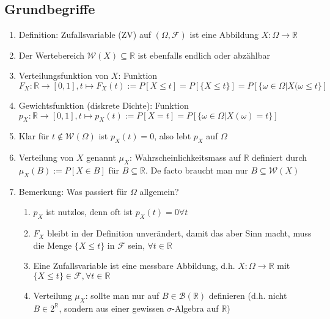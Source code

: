 \documentclass[10pt]{article}
\newcommand{\enumstart}{\begin{enumerate}}
\newcommand{\enumend}{\end{enumerate}}
\newcommand{\R}{\mathbb{R}}
\newcommand{\F}{\mathcal{F}}
\newcommand{\W}{\mathcal{W}}
\newcommand{\B}{\mathcal{B}}
\begin{document}
\subsection{Grundbegriffe}
\enumstart
	\item Definition: Zufallsvariable (ZV) auf $(\Omega, \F)$ ist eine Abbildung $X: \Omega \rightarrow \R$
	\item Der Wertebereich $\W(X) \subseteq \R$ ist ebenfalls endlich oder abzählbar
	\item Verteilungsfunktion von $X$: Funktion $F_X: \R \rightarrow [0,1], t\mapsto F_X(t) := P[X \le t] = P[\{X \le t\}] = P[\{\omega \in \Omega | X(\omega \le t\}]$
	\item Gewichtsfunktion (diskrete Dichte): Funktion $p_X: \R \rightarrow [0,1], t \mapsto p_X(t) := P[X = t] = P[\{\omega \in \Omega | X(\omega) = t\}]$
	\item Klar für $t \notin \W(\Omega)$ ist $p_X(t) = 0$, also lebt $p_X$ auf $\Omega$
	\item Verteilung von $X$ genannt $\mu_X$: Wahrscheinlichkeitsmass auf $\R$ definiert durch $\mu_X(B) := P[X \in B]$ für $B \subseteq \R$. De facto braucht man nur $B \subseteq \W(X)$
	\item Bemerkung: Was passiert für $\Omega$ allgemein?
	\enumstart
		\item $p_X$ ist nutzlos, denn oft ist $p_X(t) = 0 \forall t$
		\item $F_X$ bleibt in der Definition unverändert, damit das aber Sinn macht, muss die Menge $\{X \le t\}$ in $\F$ sein, $\forall t \in \R$
		\item Eine Zufallsvariable ist eine messbare Abbildung, d.h. $X: \Omega \rightarrow \R$ mit $\{X \le t\} \in \F, \forall t \in \R$
		\item Verteilung $\mu_X$: sollte man nur auf $B \in \B(\R)$ definieren (d.h. nicht $B \in 2^\R$, sondern aus einer gewissen $\sigma$-Algebra auf $\R$)
	\enumend
\enumend
\end{document}
